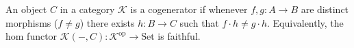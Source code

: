 An object $C$ in a category $\mathcal{K}$ is a cogenerator if whenever $f, g: A \longrightarrow B$ are distinct morphisms ($f \neq g$) there exists $h: B \longrightarrow C$ such that $f \cdot h \neq g \cdot h$. Equivalently, the hom functor $\mathcal{K}(-, C): \mathcal{K}^{\text{op}} \longrightarrow \text{Set}$ is faithful.
